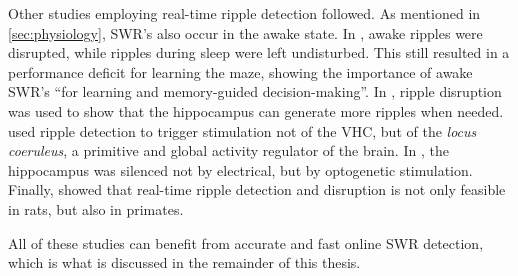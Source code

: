 
Other studies employing real-time ripple detection followed. As mentioned in \cref{sec:physiology}, SWR's also occur in the awake state. In , awake ripples were disrupted, while ripples during sleep were left undisturbed. This still resulted in a performance deficit for learning the maze, showing the importance of awake SWR's ``for learning and memory-guided decision-making''. In , ripple disruption was used to show that the hippocampus can generate more ripples when needed.  used ripple detection to trigger stimulation not of the VHC, but of the \emph{locus coeruleus}, a primitive and global activity regulator of the brain. In , the hippocampus was silenced not by electrical, but by optogenetic stimulation. Finally,  showed that real-time ripple detection and disruption is not only feasible in rats, but also in primates.

All of these studies can benefit from accurate and fast online SWR detection, which is what is discussed in the remainder of this thesis.
